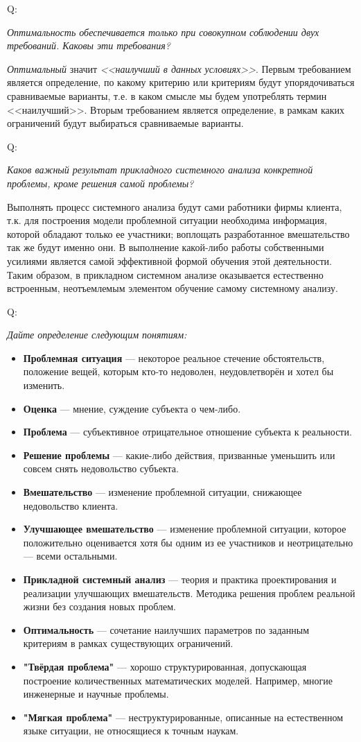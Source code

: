 \documentclass{article}
\newcommand{\note}[1]{\textit{#1}}
\newcommand{\define}[2]{
	\textbf{#1} --- #2
	}
\newcommand{\question}[2]{
	\begin{flushright}
		Q:\hspace{2ex}\vline\hspace{2ex}
		\begin{minipage}{0.9\textwidth}
			\large
			\textit{#1}
		\end{minipage}
	\end{flushright}
	\begin{center}
		\begin{minipage}{0.95\textwidth}
			#2
		\end{minipage}
	\end{center}
	}
\begin{document}
\question{Оптимальность обеспечивается только при совокупном соблюдении двух требований. Каковы эти требования?}{\note{Оптимальный} значит \note{<<наилучший в данных условиях>>}. Первым требованием является определение, по какому критерию или критериям будут упорядочиваться сравниваемые варианты, т.е. в каком смысле мы будем употреблять термин <<наилучший>>. Вторым требованием является определение, в рамкам каких ограничений будут выбираться сравниваемые варианты.}
\question{Каков важный результат прикладного системного анализа конкретной проблемы, кроме решения самой проблемы?}{Выполнять процесс системного анализа будут сами работники фирмы клиента, т.к. для построения модели проблемной ситуации необходима информация, которой обладают только ее участники; воплощать разработанное вмешательство так же будут именно они. В выполнение какой-либо работы собственными усилиями является самой эффективной формой обучения этой деятельности. Таким образом, в прикладном системном анализе оказывается естественно встроенным, неотъемлемым элементом обучение самому системному анализу.}
\question{Дайте определение следующим понятиям:}{
	\begin{itemize}
		\item \define{Проблемная ситуация}{некоторое реальное стечение обстоятельств, положение вещей, которым кто-то недоволен, неудовлетворён и хотел бы изменить.}
		\item \define{Оценка}{мнение, суждение субъекта о чем-либо.}
		\item \define{Проблема}{субъективное отрицательное отношение субъекта к реальности.}
		\item \define{Решение проблемы}{какие-либо действия, призванные уменьшить или совсем снять недовольство субъекта.}
		\item \define{Вмешательство}{изменение проблемной ситуации, снижающее недовольство клиента.}
		\item \define{Улучшающее вмешательство}{изменение проблемной ситуации, которое положительно оценивается хотя бы одним из ее участников и неотрицательно --- всеми остальными.}
		\item \define{Прикладной системный анализ}{теория и практика проектирования и реализации улучшающих вмешательств. Методика решения проблем реальной жизни без создания новых проблем.}
		\item \define{Оптимальность}{сочетание наилучших параметров по заданным критериям в рамках существующих ограничений.}
		\item \define{"Твёрдая проблема"}{хорошо структурированная, допускающая построение количественных математических моделей. Например, многие инженерные и научные проблемы.}
		\item \define{"Мягкая проблема"}{неструктурированные, описанные на естественном языке ситуации, не относящиеся к точным наукам.}
	\end{itemize}}
\end{document}
